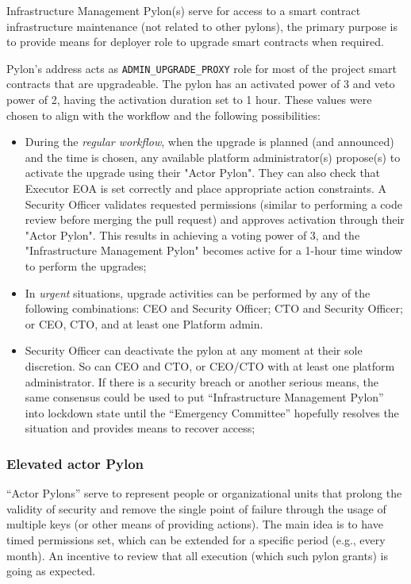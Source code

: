 \documentclass[12pt]{article}
\begin{document}
Infrastructure Management Pylon(s) serve for access to a smart contract infrastructure maintenance (not related to other pylons), the primary purpose is to provide means for deployer role to upgrade smart contracts when required.


Pylon's address acts as \texttt{ADMIN\_UPGRADE\_PROXY} role for most of the project smart contracts that are upgradeable. The pylon has an activated power of 3 and veto power of 2, having the activation duration set to 1 hour. These values were chosen to align with the workflow and the following possibilities:

\begin{itemize}

\item{During the \emph{regular workflow}, when the upgrade is planned (and announced) and the time is chosen, any available platform administrator(s) propose(s) to activate the upgrade using their "Actor Pylon". They can also check that Executor EOA is set correctly and place appropriate action constraints. A Security Officer validates requested permissions (similar to performing a code review before merging the pull request) and approves activation through their "Actor Pylon". This results in achieving a voting power of 3, and the "Infrastructure Management Pylon" becomes active for a 1-hour time window to perform the upgrades;}
\item{In \emph{urgent} situations, upgrade activities can be performed by any of the following combinations: CEO and Security Officer; CTO and Security Officer; or CEO, CTO, and at least one Platform admin.}
\item{Security Officer can deactivate the pylon at any moment at their sole discretion. So can CEO and CTO, or CEO/CTO with at least one platform administrator. If there is a security breach or another serious means, the same consensus could be used to put ``Infrastructure Management Pylon'' into lockdown state until the ``Emergency Committee'' hopefully resolves the situation and provides means to recover access;}
\end{itemize}



\pagebreak
\subsubsection{Elevated actor Pylon}

``Actor Pylons'' serve to represent people or organizational units that prolong the validity of security and remove the single point of failure through the usage of multiple keys (or other means of providing actions). The main idea is to have timed permissions set, which can be extended for a specific period (e.g., every month). An incentive to review that all execution (which such pylon grants) is going as expected.
\end{document}
